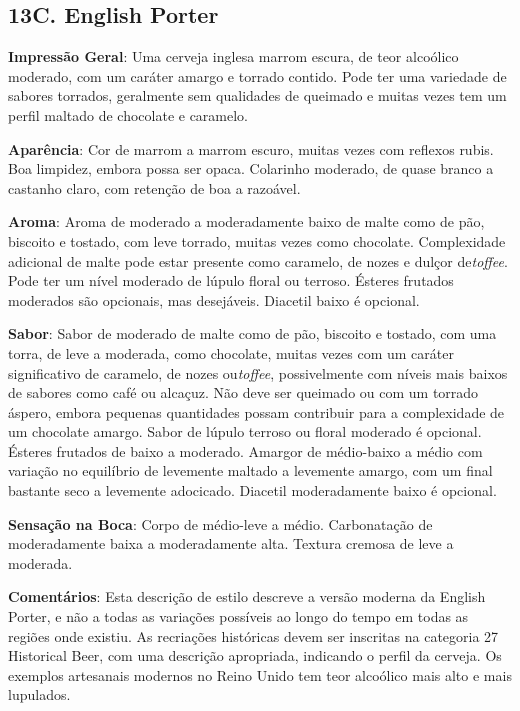 \subsection*{13C. English Porter}
\textbf{Impressão Geral}: Uma cerveja inglesa marrom escura, de teor alcoólico moderado, com um caráter amargo e torrado contido. Pode ter uma variedade de sabores torrados, geralmente sem qualidades de queimado e muitas vezes tem um perfil maltado de chocolate e caramelo.

\textbf{Aparência}: Cor de marrom a marrom escuro, muitas vezes com reflexos rubis. Boa limpidez, embora possa ser opaca. Colarinho moderado, de quase branco a castanho claro, com retenção de boa a razoável.

\textbf{Aroma}: Aroma de moderado a moderadamente baixo de malte como de pão, biscoito e tostado, com leve torrado, muitas vezes como chocolate. Complexidade adicional de malte pode estar presente como caramelo, de nozes e dulçor de\textit{toffee}. Pode ter um nível moderado de lúpulo floral ou terroso. Ésteres frutados moderados  são opcionais, mas desejáveis. Diacetil baixo é opcional.

\textbf{Sabor}: Sabor de moderado de malte como de pão, biscoito e tostado, com uma torra, de leve a moderada, como chocolate, muitas vezes com um caráter significativo de caramelo, de nozes ou\textit{toffee}, possivelmente com níveis mais baixos de sabores como café ou alcaçuz. Não deve ser queimado ou com um torrado áspero, embora pequenas quantidades possam contribuir para a complexidade de um chocolate amargo. Sabor de lúpulo terroso ou floral moderado é opcional. Ésteres frutados de baixo a moderado. Amargor de médio-baixo a médio com variação no equilíbrio de levemente maltado a levemente amargo, com um final bastante seco a levemente adocicado. Diacetil moderadamente baixo é opcional.

\textbf{Sensação na Boca}: Corpo de médio-leve a médio. Carbonatação de moderadamente baixa a moderadamente alta. Textura cremosa de leve a moderada.

\textbf{Comentários}: Esta descrição de estilo descreve a versão moderna da English Porter, e não a todas as variações possíveis ao longo do tempo em todas as regiões onde existiu. As recriações históricas devem ser inscritas na categoria 27 Historical Beer, com uma descrição apropriada, indicando o perfil da cerveja. Os exemplos artesanais modernos no Reino Unido tem teor alcoólico mais alto e mais lupulados.

